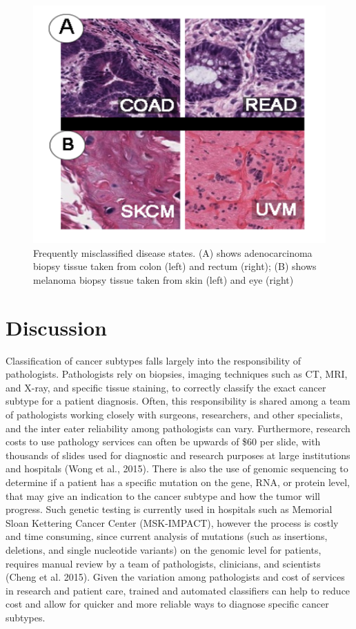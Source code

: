 \documentclass[12pt,]{article}
\begin{document}
\begin{figure}[H]

{\centering \includegraphics{figure/graphics-unnamed-chunk-16-1} 

}

\caption{Frequently misclassified disease states. (A) shows adenocarcinoma biopsy tissue taken from colon (left) and rectum (right); (B) shows melanoma biopsy tissue taken from skin (left) and eye (right)}\label{fig:unnamed-chunk-16}
\end{figure}

\newpage

\section{Discussion}\label{discussion}

Classification of cancer subtypes falls largely into the responsibility
of pathologists. Pathologists rely on biopsies, imaging techniques such
as CT, MRI, and X-ray, and specific tissue staining, to correctly
classify the exact cancer subtype for a patient diagnosis. Often, this
responsibility is shared among a team of pathologists working closely
with surgeons, researchers, and other specialists, and the inter eater
reliability among pathologists can vary. Furthermore, research costs to
use pathology services can often be upwards of \$60 per slide, with
thousands of slides used for diagnostic and research purposes at large
institutions and hospitals (Wong et al., 2015). There is also the use of
genomic sequencing to determine if a patient has a specific mutation on
the gene, RNA, or protein level, that may give an indication to the
cancer subtype and how the tumor will progress. Such genetic testing is
currently used in hospitals such as Memorial Sloan Kettering Cancer
Center (MSK-IMPACT), however the process is costly and time consuming,
since current analysis of mutations (such as insertions, deletions, and
single nucleotide variants) on the genomic level for patients, requires
manual review by a team of pathologists, clinicians, and scientists
(Cheng et al. 2015). Given the variation among pathologists and cost of
services in research and patient care, trained and automated classifiers
can help to reduce cost and allow for quicker and more reliable ways to
diagnose specific cancer subtypes.
\end{document}
